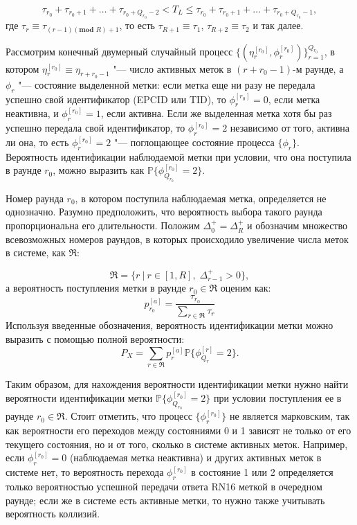 $$
\tau_{r_0} + \tau_{r_0 + 1} + \dots + \tau_{r_0 + Q_{r_0} - 2} < T_L \leqslant \tau_{r_0} + \tau_{r_0 + 1} + \dots + \tau_{r_0 + Q_{r_0} - 1},
$$
где $\tau_{r} \equiv \tau_{(r - 1)(\textbf{mod } R) + 1}$, то есть $\tau_{R+1} \equiv \tau_1$, $\tau_{R+2} \equiv \tau_2$ и так далее.

Рассмотрим конечный двумерный случайный процесс $\{ (\eta_r^{[r_0]}, \phi_r^{[r_0]}) \}_{r=1}^{Q_{r_0}}$, в котором $\eta_r^{[r_0]} \equiv \eta_{r+r_0-1}$ "--- число активных меток в $(r + r_0 - 1)$-м раунде, а $\phi_r$ "--- состояние выделенной метки: если метка еще ни разу не передала успешно свой идентификатор (EPCID или TID), то $\phi_r^{[r_0]} = 0$, если метка неактивна, и $\phi_r^{[r_0]} = 1$, если активна. Если же выделенная метка хотя бы раз успешно передала свой идентификатор, то $\phi_r^{[r_0]} = 2$ независимо от того, активна ли она, то есть $\phi_r^{[r_0]} = 2$ "--- поглощающее состояние процесса $\{ \phi_r \}$. Вероятность идентификации наблюдаемой метки при условии, что она поступила в раунде $r_0$, можно выразить как $\mathbb{P}\{ \phi_{Q_{r_0}}^{[r_0]} = 2\}$.

Номер раунда $r_0$, в котором поступила наблюдаемая метка, определяется не однозначно. Разумно предположить, что вероятность выбора такого раунда пропорциональна его длительности. Положим $\Delta_0^+ = \Delta_R^+$ и обозначим множество всевозможных номеров раундов, в которых происходило увеличение числа меток в системе, как $\mathfrak{R}$:

$$
	\mathfrak{R} = \{ r\:|\:r \in [1, R],\; \Delta_{r-1}^+ > 0 \},
$$
а вероятность поступления метки в раунде $r_0 \in \mathfrak{R}$ оценим как:
\begin{equation}\label{eq:ch3_fg_prob_arrival}
	p^{[a]}_{r_0} = \frac{\tau_{r_0}}{\sum_{r \in \mathfrak{R}} \tau_r}
\end{equation}
Используя введенные обозначения, вероятность идентификации метки можно выразить с помощью полной вероятности:
\begin{equation}\label{eq:ch3_tag_id_prob_phi}
	P_X = \sum\limits_{r \in \mathfrak{R}} p^{[a]}_r \mathbb{P}\{ \phi^{[r]}_{Q_r} = 2 \}.
\end{equation}

Таким образом, для нахождения вероятности идентификации метки нужно найти вероятности идентификации метки $\mathbb{P}\{ \phi^{[r_0]}_{Q_{r_0}} = 2 \}$ при условии поступления ее в раунде $r_0 \in \mathfrak{R}$. Стоит отметить, что процесс $\{ \phi^{[r_0]}_r \}$ не является марковским, так как вероятности его переходов между состояниями 0 и 1 зависят не только от его текущего состояния, но и от того, сколько в системе активных меток. Например, если $\phi_r^{[r_0]} = 0$ (наблюдаемая метка неактивна) и других активных меток в системе нет, то вероятность перехода $\phi_r^{[r_0]}$ в состояние 1 или 2 определяется только вероятностью успешной передачи ответа RN16 меткой в очередном раунде; если же в системе есть активные метки, то нужно также учитывать вероятность коллизий.



